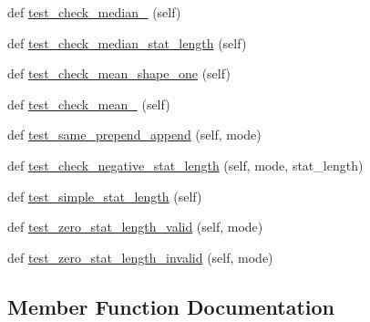 \begin{DoxyCompactItemize}
\item 
def \hyperlink{classnumpy_1_1lib_1_1tests_1_1test__arraypad_1_1TestStatistic_a5e9ecf84231f7e22ab9ddbefdb034d7b}{test\+\_\+check\+\_\+median\+\_} (self)
\item 
def \hyperlink{classnumpy_1_1lib_1_1tests_1_1test__arraypad_1_1TestStatistic_a2604e80af424a4d4ce4c9fd241aa9111}{test\+\_\+check\+\_\+median\+\_\+stat\+\_\+length} (self)
\item 
def \hyperlink{classnumpy_1_1lib_1_1tests_1_1test__arraypad_1_1TestStatistic_a9c65072e457bcdd269eeda6cf90a1015}{test\+\_\+check\+\_\+mean\+\_\+shape\+\_\+one} (self)
\item 
def \hyperlink{classnumpy_1_1lib_1_1tests_1_1test__arraypad_1_1TestStatistic_a8c3567805477026a20b25d0b6a8258b3}{test\+\_\+check\+\_\+mean\+\_} (self)
\item 
def \hyperlink{classnumpy_1_1lib_1_1tests_1_1test__arraypad_1_1TestStatistic_aa4ed2ca063fd45f4244e2eaeb912644a}{test\+\_\+same\+\_\+prepend\+\_\+append} (self, mode)
\item 
def \hyperlink{classnumpy_1_1lib_1_1tests_1_1test__arraypad_1_1TestStatistic_a51625648c0505dde3cf6db02398ee985}{test\+\_\+check\+\_\+negative\+\_\+stat\+\_\+length} (self, mode, stat\+\_\+length)
\item 
def \hyperlink{classnumpy_1_1lib_1_1tests_1_1test__arraypad_1_1TestStatistic_a9b6f84e5b1fcfaad8ff310baa52d3bc9}{test\+\_\+simple\+\_\+stat\+\_\+length} (self)
\item 
def \hyperlink{classnumpy_1_1lib_1_1tests_1_1test__arraypad_1_1TestStatistic_afc39a4269f9a4539d7a661402d65ba32}{test\+\_\+zero\+\_\+stat\+\_\+length\+\_\+valid} (self, mode)
\item 
def \hyperlink{classnumpy_1_1lib_1_1tests_1_1test__arraypad_1_1TestStatistic_ac6e5c9c4e50c2f2d852a5112a03f8492}{test\+\_\+zero\+\_\+stat\+\_\+length\+\_\+invalid} (self, mode)
\end{DoxyCompactItemize}


\subsection{Member Function Documentation}
\mbox{\label{classnumpy_1_1lib_1_1tests_1_1test__arraypad_1_1TestStatistic_a37ce8fd7f1e381b62a5f9db13a215494}} 
